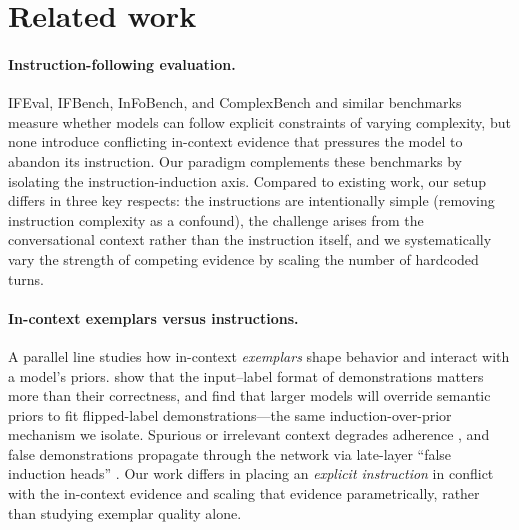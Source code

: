 \section{Related work}
\label{sec:related}

\paragraph{Instruction-following evaluation.}
IFEval, IFBench, InFoBench, and ComplexBench \citep{zhou_instruction-following_2023, pyatkin_generalizing_2025, qin_infobench_2024, wen_benchmarking_2024} and similar benchmarks measure whether models can follow   explicit constraints of varying complexity, but none introduce conflicting in-context evidence that pressures the model to abandon its instruction. Our paradigm complements these benchmarks by isolating the instruction-induction axis. Compared to existing work, our setup differs in three key respects: the instructions are intentionally simple (removing instruction complexity as a confound), the challenge arises from the conversational context rather than the instruction itself, and we systematically vary the strength of competing evidence by scaling the number of hardcoded turns.

\paragraph{In-context exemplars versus instructions.}
A parallel line studies how in-context \emph{exemplars} shape behavior and interact with a model's priors. \citet{minRethinkingRoleDemonstrations2022} show that the input--label format of demonstrations matters more than their correctness, and \citet{weiLargerLanguageModels2023} find that larger models will override semantic priors to fit flipped-label demonstrations---the same induction-over-prior mechanism we isolate. Spurious or irrelevant context degrades adherence \citep{shiLargeLanguageModels2023}, and false demonstrations propagate through the network via late-layer ``false induction heads'' \citep{halawiOverthinkingTruth2024}. Our work differs in placing an \emph{explicit instruction} in conflict with the in-context evidence and scaling that evidence parametrically, rather than studying exemplar quality alone.

